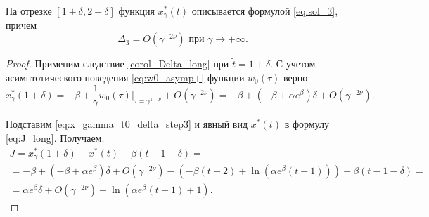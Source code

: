 \begin{lemma}
	\label{lm:Delta3}
	На отрезке $[1 + \delta, 2 - \delta]$ функция $x_\gamma^*(t)$ описывается формулой \eqref{eq:sol_3}, причем
	\[
	\Delta_3 = O(\gamma^{-2\nu}) \text{ при } \gamma \to +\infty.
	\]
\end{lemma}
\begin{proof}
Применим следствие \ref{corol_Delta_long} при $\tilde{t} = 1 + \delta$. С учетом асимптотического поведения \eqref{eq:w0_asymp+} функции $w_0(\tau)$ верно
\begin{equation}
\label{eq:x_gamma_t0_delta_step3}
	x_\gamma^*(1 + \delta) = -\beta + \frac{1}{\gamma} w_0(\tau)|_{\tau=\gamma^{1 - \nu}} + O(\gamma^{-2\nu}) = -\beta + (-\beta + \alpha e^\beta)\delta + O(\gamma^{-2\nu}).
\end{equation}

Подставим \eqref{eq:x_gamma_t0_delta_step3} и явный вид $x^*(t)$ в формулу \eqref{eq:J_long}. Получаем:
\begin{multline}
	\label{eq:J_step3}
	J = x_\gamma^*(1 + \delta) - x^*(t) - \beta(t - 1 - \delta) =\\
	= -\beta + (-\beta + \alpha e^\beta)\delta + O(\gamma^{-2\nu}) - 
	(-\beta(t - 2) + \ln(\alpha e^{\beta}(t - 1))) - \beta (t - 1 - \delta) = \\
	 =\alpha e^\beta\delta + O(\gamma^{-2\nu}) - \ln(\alpha e^{\beta}(t - 1) + 1).
\end{multline}


\end{proof}
